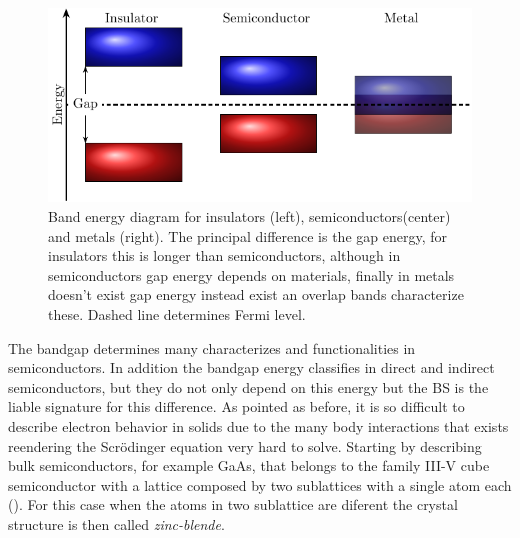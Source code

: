 \begin{figure}[h!]
	\centering
	\includegraphics[width=\linewidth]{../figures/chapter-1/solid-sort/build/solid-sort}
	\caption{Band energy diagram for insulators (left), semiconductors(center) and metals (right). The principal difference is the gap energy, for insulators this is longer than semiconductors, although in semiconductors gap energy depends on materials, finally in metals doesn't exist gap energy instead exist an overlap bands characterize these. Dashed line determines Fermi level.  }
	\label{fig:subsubsection-1.1.1-solid-types}
\end{figure}

The bandgap determines many characterizes and functionalities in semiconductors. In addition the bandgap energy classifies in direct and indirect semiconductors, but they do not only depend on this energy but the \gls{BS} is the liable signature for this difference. As pointed as before, it is so difficult to describe electron behavior in solids due to the many body interactions that exists reendering the Scr\"odinger equation very hard to solve. 
Starting by describing bulk semiconductors, for example GaAs, that belongs to the  family III-V cube semiconductor with a lattice composed by two sublattices with a single atom each (). For this case when the atoms in two sublattice are diferent the crystal structure is then called \emph{zinc-blende}\cite{vurgaftman2020bands}.

